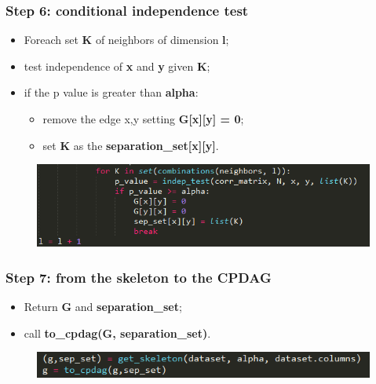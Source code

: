 \documentclass[xcolor ={table,usenames,dvipsnames}]{beamer}
\theoremstyle{definition}
\begin{document}
\begin{frame}
\frametitle{Step 6: conditional independence test}
\begin{itemize}
	\item Foreach set \textbf{K} of neighbors of dimension \textbf{l};
	\item test independence of \textbf{x} and \textbf{y} given \textbf{K};
	\item if the p value is greater than \textbf{alpha}:
	\begin{itemize}
		\item remove the edge x,y setting \textbf{G[x][y] = 0};
		\item set \textbf{K} as the \textbf{separation\_set[x][y]}.
	\end{itemize}
\end{itemize}
	\begin{figure}[h!]
		\centering
		\includegraphics[scale=0.6]{img/indeptest.PNG}
		\label{Interfacce di un CS}
	\end{figure}
\end{frame}
\begin{frame}
\frametitle{Step 7: from the skeleton to the CPDAG}
\begin{itemize}
	\item Return \textbf{G} and \textbf{separation\_set};
	\item call \textbf{to\_cpdag(G, separation\_set)}.
\end{itemize}
	\begin{figure}[h!]
		\centering
		\includegraphics[scale=0.75]{img/tocpdag.PNG}
		\label{Interfacce di un CS}
	\end{figure}
\end{frame}
\end{document}
